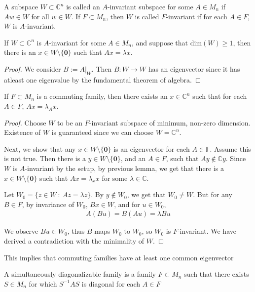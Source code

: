 \begin{definition}
  A subspace $W \subset \mathbb{C}^n$ is called an $A$-invariant
  subspace for some $A \in M_n$ if $Aw \in W$ for all $w \in W$. If
  $F \subset M_n$, then $W$ is called $F$-invariant if for each $A
  \in F$, $W$ is $A$-invariant.
\end{definition}

\begin{lemma}
  If $W \subset \mathbb{C}^n$ is $A$-invariant for some $A \in M_n$,
  and suppose that $\textrm{dim}(W) \ge 1$, then there is an $x \in W
  \setminus \{  \textbf{0} \}$ such that $Ax = \lambda x$.
\end{lemma}
\begin{proof}
  We consider $B:= A|_W$. Then $B: W \to W$ has an eigenvector since
  it has atleast one eigenvalue by the fundamental theorem of algebra.
\end{proof}

\begin{lemma}
  If $F \subset M_n$ is a commuting family, then there exists an $x
  \in \mathbb{C}^n$ such that for each $A \in F$, $Ax = \lambda_A x$.
\end{lemma}
\begin{proof}
  Choose $W$ to be an $F$-invariant subspace of minimum, non-zero
  dimension. Existence of $W$ is guaranteed since we can choose $W =
  \mathbb{C}^n$.

  Next, we show that any $ x \in W \setminus \{ \textbf{0} \}$ is an
  eigenvector for each $ A \in \mathbb{F}$. Assume this is not true.
  Then there is  a $ y\in W \setminus \{ \textbf{0} \}$, and an $ A
  \in F$, such that $Ay \not\in \mathbb{C}y$. Since $W$ is
  $A$-invariant by the setup, by previous lemma, we get that there is
  a $x \in W \setminus \{ \textbf{0} \}$ such that $Ax = \lambda_x x$
  for some $\lambda \in \mathbb{C}$.

  Let $ W_0 = \{ z \in W \ : \ Az = \lambda z \}$. By $y \notin W_0$,
  we get that $W_0 \neq W$. But for any $B \in F$, by invariance of
  $W_0$, $Bx \in W$, and for $u \in W_0$,
  \begin{align*}
    A(Bu) = B(Au) =  \lambda Bu
  \end{align*}

  We observe $Bu \in W_0$, thus $B$ maps $W_0$ to $W_0$, so $ W_0$ is
  $ F$-invariant. We have derived a contradiction with the minimality of $W$.
\end{proof}

\begin{remark}
  This implies that commuting families have at least one common eigenvector
\end{remark}

\begin{definition}
  A simultaneously diagonalizable family is a family $F \subset M_n$
  such that there exists $S \in M_n$ for which $S^{-1} A S$ is
  diagonal for each $A \in F$
\end{definition}
